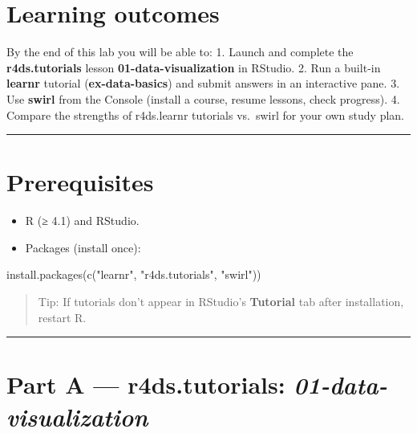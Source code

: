 \documentclass[
  letterpaper,
  DIV=11,
  numbers=noendperiod]{scrreprt}
\newenvironment{Shaded}{\begin{snugshade}}{\end{snugshade}}
\newcommand{\FunctionTok}[1]{\textcolor[rgb]{0.28,0.35,0.67}{#1}}
\newcommand{\NormalTok}[1]{\textcolor[rgb]{0.00,0.23,0.31}{#1}}
\newcommand{\StringTok}[1]{\textcolor[rgb]{0.13,0.47,0.30}{#1}}
\providecommand{\tightlist}{%
  \setlength{\itemsep}{0pt}\setlength{\parskip}{0pt}}
\begin{document}
\section{Learning outcomes}\label{learning-outcomes-1}

By the end of this lab you will be able to: 1. Launch and complete the
\textbf{r4ds.tutorials} lesson \textbf{01-data-visualization} in
RStudio. 2. Run a built‑in \textbf{learnr} tutorial
(\textbf{ex-data-basics}) and submit answers in an interactive pane. 3.
Use \textbf{swirl} from the Console (install a course, resume lessons,
check progress). 4. Compare the strengths of r4ds.learnr tutorials
vs.~swirl for your own study plan.

\begin{center}\rule{0.5\linewidth}{0.5pt}\end{center}

\section{Prerequisites}\label{prerequisites-1}

\begin{itemize}
\tightlist
\item
  R (≥ 4.1) and RStudio.
\item
  Packages (install once):
\end{itemize}

\begin{Shaded}
\begin{Highlighting}[]
\FunctionTok{install.packages}\NormalTok{(}\FunctionTok{c}\NormalTok{(}\StringTok{"learnr"}\NormalTok{, }\StringTok{"r4ds.tutorials"}\NormalTok{, }\StringTok{"swirl"}\NormalTok{))}
\end{Highlighting}
\end{Shaded}

\begin{quote}
Tip: If tutorials don't appear in RStudio's \textbf{Tutorial} tab after
installation, restart R.
\end{quote}

\begin{center}\rule{0.5\linewidth}{0.5pt}\end{center}

\section{\texorpdfstring{Part A --- r4ds.tutorials:
\emph{01-data-visualization}}{Part A --- r4ds.tutorials: 01-data-visualization}}\label{part-a-r4ds.tutorials-01-data-visualization}
\end{document}
